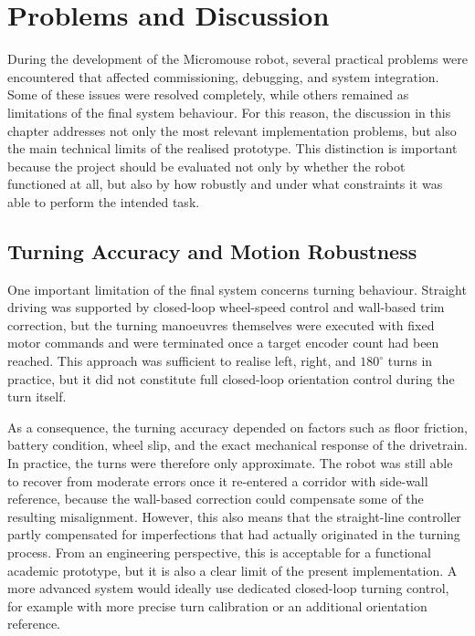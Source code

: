 \section{Problems and Discussion}

During the development of the Micromouse robot, several practical problems were encountered that affected commissioning, debugging, and system integration. Some of these issues were resolved completely, while others remained as limitations of the final system behaviour. For this reason, the discussion in this chapter addresses not only the most relevant implementation problems, but also the main technical limits of the realised prototype. This distinction is important because the project should be evaluated not only by whether the robot functioned at all, but also by how robustly and under what constraints it was able to perform the intended task.

\subsection{Turning Accuracy and Motion Robustness}

One important limitation of the final system concerns turning behaviour. Straight driving was supported by closed-loop wheel-speed control and wall-based trim correction, but the turning manoeuvres themselves were executed with fixed motor commands and were terminated once a target encoder count had been reached. This approach was sufficient to realise left, right, and $180^\circ$ turns in practice, but it did not constitute full closed-loop orientation control during the turn itself.

As a consequence, the turning accuracy depended on factors such as floor friction, battery condition, wheel slip, and the exact mechanical response of the drivetrain. In practice, the turns were therefore only approximate. The robot was still able to recover from moderate errors once it re-entered a corridor with side-wall reference, because the wall-based correction could compensate some of the resulting misalignment. However, this also means that the straight-line controller partly compensated for imperfections that had actually originated in the turning process. From an engineering perspective, this is acceptable for a functional academic prototype, but it is also a clear limit of the present implementation. A more advanced system would ideally use dedicated closed-loop turning control, for example with more precise turn calibration or an additional orientation reference.

